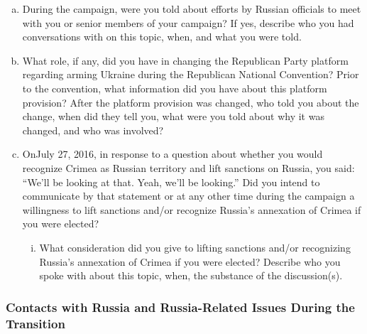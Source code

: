 \begin{enumerate}[a.]
\item During the campaign, were you told about efforts by Russian officials to meet with you or senior members of your campaign?
If yes, describe who you had conversations with on this topic, when, and what you were told.

\item What role, if any, did you have in changing the Republican Party platform regarding arming Ukraine during the Republican National Convention?
Prior to the convention, what information did you have about this platform provision?
After the platform provision was changed, who told you about the change, when did they tell you, what were you told about why it was changed, and who was involved?

\item OnJuly 27, 2016, in response to a question about whether you would recognize Crimea as Russian territory and lift sanctions on Russia, you said: “We'll be looking at that. Yeah, we'll be looking.”
Did you intend to communicate by that statement or at any other time during the campaign a willingness to lift sanctions and/or recognize Russia’s annexation of Crimea if you were elected?

\begin{enumerate}[i.]

\item What consideration did you give to lifting sanctions and/or recognizing Russia’s annexation of Crimea if you were elected?
Describe who you spoke with about this topic, when, the substance of the discussion(s).

\end{enumerate}

\end{enumerate}

\subsubsection{Contacts with Russia and Russia-Related Issues During the Transition}

